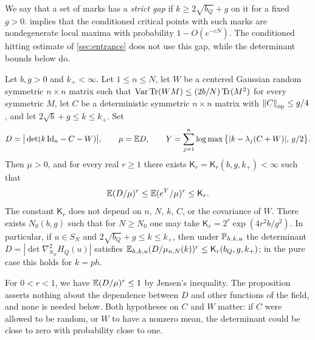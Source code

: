 We say that a set of marks has a \emph{strict gap} if $k\ge2\sqrt{b_Q}+g$ on it for a fixed $g>0$.  implies that the conditioned critical points with such marks are nondegenerate local maxima with probability $1-O(e^{-cN})$. The conditioned hitting estimate of \cref{sec:entrance} does not use this gap, while the determinant bounds below do.

\begin{proposition}\label{prop:kr-determinant}
Let $b,g>0$ and $k_+<\infty$. Let $1\le n\le N$, let $W$ be a centered Gaussian random symmetric $n\times n$ matrix such that $\operatorname{Var}\operatorname{Tr}(WM)\le(2b/N)\operatorname{Tr}(M^2)$ for every symmetric $M$, let $C$ be a deterministic symmetric $n\times n$ matrix with $\left\lVert C\right\rVert_{\rm op}\le g/4$, and let $2\sqrt b+g\le k\le k_+$. Set
\[
D=\big|\det(k\,\mathrm{Id}_n-C-W)\big|,\qquad \mu=\mathbb E D,\qquad Y=\sum_{j=1}^n\log\max\big\{|k-\lambda_j(C+W)|,\,g/2\big\}.
\]
Then $\mu>0$, and for every real $r\ge1$ there exists $\mathsf K_r=\mathsf K_r(b,g,k_+)<\infty$ such that
\begin{equation}\label{eq:kr-det-moments}
\mathbb E(D/\mu)^r\le\mathbb E(e^Y/\mu)^r\le\mathsf K_r.
\end{equation}
The constant $\mathsf K_r$ does not depend on $n$, $N$, $k$, $C$, or the covariance of $W$. There exists $N_0(b,g)$ such that for $N\ge N_0$ one may take $\mathsf K_r=2^r\exp(4r^2b/g^2)$. In particular, if $u\in S_N$ and $2\sqrt{b_Q}+g\le k\le k_+$, then under $\mathbb P_{h,k,u}$ the determinant $D=|\det\nabla^2_{S_N}H_Q(u)|$ satisfies $\mathbb E_{h,k,u}(D/\mu_{n,N}(k))^r\le\mathsf K_r(b_Q,g,k_+)$; in the pure case this holds for $k=ph$.
\end{proposition}

For $0<r<1$, we have $\mathbb E(D/\mu)^r\le1$ by Jensen's inequality. The proposition asserts nothing about the dependence between $D$ and other functions of the field, and none is needed below. Both hypotheses on $C$ and $W$ matter: if $C$ were allowed to be random, or $W$ to have a nonzero mean, the determinant could be close to zero with probability close to one.

